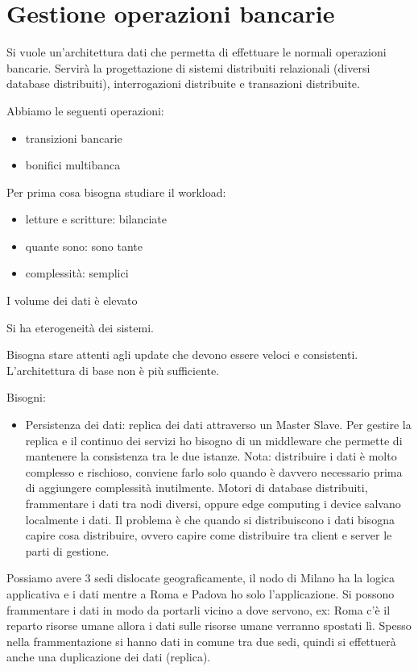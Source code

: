 \section{Gestione operazioni bancarie}
Si vuole un'architettura dati che permetta di effettuare le normali operazioni
bancarie. Servirà la progettazione di sistemi distribuiti relazionali (diversi database distribuiti),
interrogazioni distribuite e transazioni distribuite.

Abbiamo le seguenti operazioni:
\begin{itemize}
    \item transizioni bancarie
    \item bonifici multibanca
\end{itemize}

Per prima cosa bisogna studiare il workload:
\begin{itemize}
    \item letture e scritture: bilanciate
    \item quante sono: sono tante
    \item complessità: semplici
\end{itemize}

I volume dei dati è elevato

Si ha eterogeneità dei sistemi.

Bisogna stare attenti agli update che devono essere veloci e consistenti. L'architettura
di base non è più sufficiente.

Bisogni:
\begin{itemize}
    \item Persistenza dei dati: replica dei dati attraverso un Master Slave. Per
          gestire la replica e il continuo dei servizi ho bisogno di un middleware che
          permette di mantenere la consistenza tra le due istanze. Nota: distribuire
          i dati è molto complesso e rischioso, conviene farlo solo quando è davvero
          necessario prima di aggiungere complessità inutilmente. Motori di database
          distribuiti, frammentare i dati tra nodi diversi, oppure edge computing i device
          salvano localmente i dati. Il problema è che quando si distribuiscono i dati
          bisogna capire cosa distribuire, ovvero capire come distribuire tra client e
          server le parti di gestione.
\end{itemize}

Possiamo avere 3 sedi dislocate geograficamente, il nodo di Milano ha la logica applicativa
e i dati mentre a Roma e Padova ho solo l'applicazione. Si possono frammentare i
dati in modo da portarli vicino a dove servono, ex: Roma c'è il reparto risorse
umane allora i dati sulle risorse umane verranno spostati lì. Spesso nella frammentazione
si hanno dati in comune tra due sedi, quindi si effettuerà anche una duplicazione
dei dati (replica).
